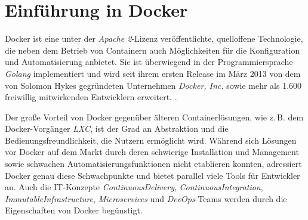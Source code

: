 \documentclass[../main.tex]{subfiles}
\begin{document}


  \section{Einführung in Docker}
  \label{dockerIntro}
    Docker ist eine unter der \emph{Apache 2}-Lizenz veröffentlichte, quelloffene Technologie, die neben dem Betrieb von Containern auch Möglichkeiten für die Konfiguration und Automatisierung anbietet. Sie ist überwiegend in der Programmiersprache \emph{Golang} implementiert und wird seit ihrem ersten Release im März 2013 von dem von Solomon Hykes gegründeten Unternehmen \emph{Docker, Inc.}\cite{dockerHykes} sowie mehr als 1.600 freiwillig mitwirkenden Entwicklern erweitert. \cite{githubDocker}\cite[S.7]{dockerBook}\cite{githubDockerChangelog}\cite{dockerCompany}.




    Der große Vorteil von Docker gegenüber älteren Containerlösungen, wie z.\,B. dem Docker-Vorgänger \emph{LXC}, ist der Grad an Abstraktion und die Bedienungsfreundlichkeit, die Nutzern ermöglicht wird. Während sich Lösungen vor Docker auf dem Markt durch deren schwierige Installation und Management sowie schwachen Automatisierungsfunktionen nicht etablieren konnten, adressiert Docker genau diese Schwachpunkte \cite[S.7]{dockerBook} und bietet parallel viele Tools für Entwickler an. Auch die IT-Konzepte \emph{\gls{ContinuousDelivery}}, \emph{\gls{ContinuousIntegration}}, \emph{\gls{ImmutableInfrastructure}}, \emph{\glspl{Microservice}} und \emph{\gls{DevOps}}-Teams werden durch die Eigenschaften von Docker begünstigt.
\end{document}
